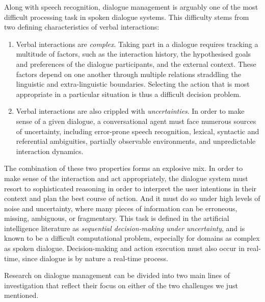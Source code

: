 Along with speech recognition, dialogue management is arguably one of the most difficult processing task in spoken dialogue systems. This difficulty stems from two defining characteristics of verbal interactions:
\begin{enumerate}
\item Verbal interactions are \textit{complex}.   Taking part in a dialogue requires tracking a multitude of factors, such as the interaction history, the hypothesised goals and preferences of the dialogue participants, and the external context. These factors depend on one another through multiple relations straddling the linguistic and extra-linguistic boundaries.  Selecting the action that is most appropriate in a particular situation is thus a difficult decision problem. 

\item Verbal interactions are also crippled with \textit{uncertainties}.  In order to make sense of a given dialogue, a conversational agent must face numerous sources of uncertainty, including error-prone speech recognition, lexical,  syntactic and referential ambiguities, partially observable environments, and unpredictable interaction dynamics.  
\end{enumerate} 

The combination of these two properties forms an explosive mix.  In order to make sense of the interaction and act appropriately, the dialogue system must resort to sophisticated reasoning in order to interpret the user intentions in their context and plan the best course of action.  And it must do so under high levels of noise and uncertainty, where many pieces of information can be erroneous, missing, ambiguous, or fragmentary. This task is defined in the artificial intelligence literature as \textit{sequential decision-making under uncertainty}, and is known to be a difficult computational problem, especially for domains as complex as spoken dialogue. Decision-making and action execution must also occur in real-time, since dialogue is by nature a real-time process. 


Research on dialogue management can be divided into two main lines of investigation that reflect their focus on either of the two challenges we just mentioned.  

